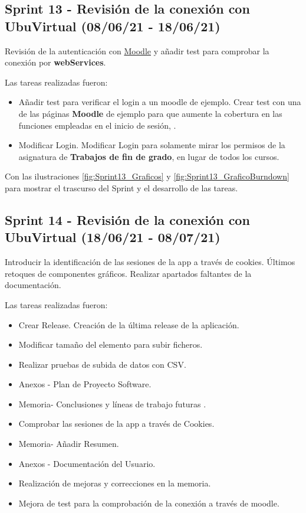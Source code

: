 \subsection{Sprint 13 - Revisión de la conexión con UbuVirtual (08/06/21 - 18/06/21)}
Revisión de la autenticación con \href{https://moodle.org/}{Moodle} y añadir test para comprobar la conexión por \textbf{webServices}.

Las tareas realizadas fueron:
\begin{itemize}
	\item Añadir test para verificar el login a un moodle de ejemplo.
		Crear test con una de las páginas \textbf{Moodle} de ejemplo para que aumente la cobertura en las funciones empleadas en el inicio de sesión, .
	\item Modificar Login.
		Modificar Login para solamente mirar los permisos de la asignatura de \textbf{Trabajos de fin de grado}, en lugar de todos los cursos.
\end{itemize}

Con las ilustraciones \ref{fig:Sprint13_Graficos} y \ref{fig:Sprint13_GraficoBurndown} para mostrar el trascurso del Sprint y el desarrollo de las tareas.



\subsection{Sprint 14 - Revisión de la conexión con UbuVirtual (18/06/21 - 08/07/21)}
Introducir la identificación de las sesiones de la app a través de cookies. Últimos retoques de componentes gráficos. Realizar apartados faltantes de la documentación.

Las tareas realizadas fueron:
\begin{itemize}
	\item Crear Release. Creación de la última release de la aplicación.
	\item Modificar tamaño del elemento para subir ficheros.
	\item Realizar pruebas de subida de datos con CSV.
	\item Anexos - Plan de Proyecto Software.
	\item Memoria- Conclusiones y líneas de trabajo futuras .
	\item Comprobar las sesiones de la app a través de Cookies.
	\item Memoria- Añadir Resumen. 
	\item Anexos - Documentación del Usuario.
	\item Realización de mejoras y correcciones en la memoria.
	\item Mejora de test para la comprobación de la conexión a través de moodle.
\end{itemize}

